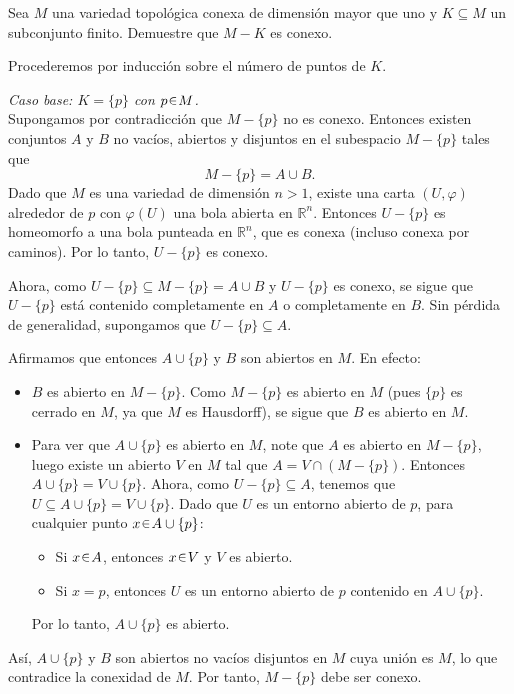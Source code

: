 \begin{ejer}
Sea $M$ una variedad topológica conexa de dimensión mayor que uno y $K\subseteq M$ un subconjunto finito. Demuestre que $M-K$ es conexo.
\end{ejer}
\begin{sol}[Demostración]
Procederemos por inducción sobre el número de puntos de $K$.\par\vspace{1em}
\emph{Caso base: $K = \{p\}$ con $p \en M$.}\\ 
Supongamos por contradicción que $M - \{p\}$ no es conexo. Entonces existen conjuntos $A$ y $B$ no vacíos, abiertos y disjuntos en el subespacio $M - \{p\}$ tales que
\[
M - \{p\} = A \cup B.
\]
Dado que $M$ es una variedad de dimensión $n > 1$, existe una carta $(U, \varphi)$ alrededor de $p$ con $\varphi(U)$ una bola abierta en $\mathbb{R}^n$. Entonces $U - \{p\}$ es homeomorfo a una bola punteada en $\mathbb{R}^n$, que es conexa (incluso conexa por caminos). Por lo tanto, $U - \{p\}$ es conexo.

Ahora, como $U - \{p\} \subseteq M - \{p\} = A \cup B$ y $U - \{p\}$ es conexo, se sigue que $U - \{p\}$ está contenido completamente en $A$ o completamente en $B$. Sin pérdida de generalidad, supongamos que $U - \{p\} \subseteq A$.

Afirmamos que entonces $A \cup \{p\}$ y $B$ son abiertos en $M$. En efecto:
\begin{itemize}
    \item $B$ es abierto en $M - \{p\}$. Como $M - \{p\}$ es abierto en $M$ (pues $\{p\}$ es cerrado en $M$, ya que $M$ es Hausdorff), se sigue que $B$ es abierto en $M$.
    \item Para ver que $A \cup \{p\}$ es abierto en $M$, note que $A$ es abierto en $M - \{p\}$, luego existe un abierto $V$ en $M$ tal que $A = V \cap (M - \{p\})$. Entonces $A \cup \{p\} = V \cup \{p\}$. Ahora, como $U - \{p\} \subseteq A$, tenemos que $U \subseteq A \cup \{p\} = V \cup \{p\}$. Dado que $U$ es un entorno abierto de $p$, para cualquier punto $x \en A \cup \{p\}$:
    \begin{itemize}
        \item Si $x \en A$, entonces $x \en V$ y $V$ es abierto.
        \item Si $x = p$, entonces $U$ es un entorno abierto de $p$ contenido en $A \cup \{p\}$.
    \end{itemize}
    Por lo tanto, $A \cup \{p\}$ es abierto.
\end{itemize}
Así, $A \cup \{p\}$ y $B$ son abiertos no vacíos disjuntos en $M$ cuya unión es $M$, lo que contradice la conexidad de $M$. 
Por tanto, $M - \{p\}$ debe ser conexo.\par\vspace{1em}


\end{sol}
